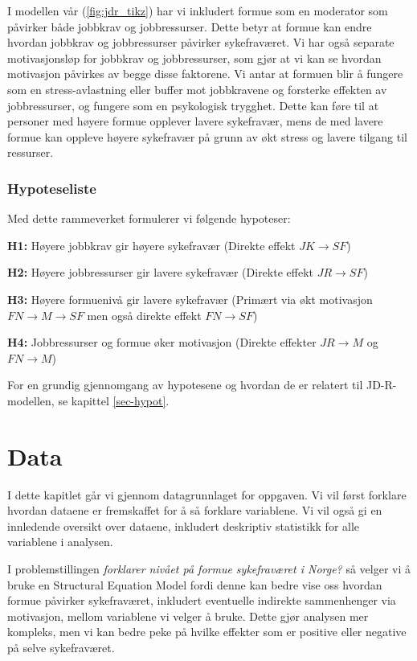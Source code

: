 \documentclass[
  12pt,
  a4paper,
  DIV=11,
  numbers=noendperiod]{scrartcl}
\begin{document}
I modellen vår (\autoref{fig:jdr_tikz}) har vi inkludert formue som en
moderator som påvirker både jobbkrav og jobbressurser. Dette betyr at
formue kan endre hvordan jobbkrav og jobbressurser påvirker
sykefraværet. Vi har også separate motivasjonsløp for jobbkrav og
jobbressurser, som gjør at vi kan se hvordan motivasjon påvirkes av
begge disse faktorene. Vi antar at formuen blir å fungere som en
stress-avlastning eller buffer mot jobbkravene og forsterke effekten av
jobbressurser, og fungere som en psykologisk trygghet. Dette kan føre
til at personer med høyere formue opplever lavere sykefravær, mens de
med lavere formue kan oppleve høyere sykefravær på grunn av økt stress
og lavere tilgang til ressurser.

\subsubsection{Hypoteseliste}\label{hypoteseliste}

Med dette rammeverket formulerer vi følgende hypoteser:

\textbf{H1:} Høyere jobbkrav gir høyere sykefravær (Direkte effekt
\(JK \rightarrow SF\))

\textbf{H2:} Høyere jobbressurser gir lavere sykefravær (Direkte effekt
\(JR \rightarrow SF\))

\textbf{H3:} Høyere formuenivå gir lavere sykefravær (Primært via økt
motivasjon \(FN \rightarrow M \rightarrow SF\) men også direkte effekt
\(FN \rightarrow SF\))

\textbf{H4:} Jobbressurser og formue øker motivasjon (Direkte effekter
\(JR \rightarrow M\) og \(FN \rightarrow M\))

For en grundig gjennomgang av hypotesene og hvordan de er relatert til
JD-R-modellen, se kapittel \ref{sec-hypot}.

\section{Data}\label{data}

I dette kapitlet går vi gjennom datagrunnlaget for oppgaven. Vi vil
først forklare hvordan dataene er fremskaffet for å så forklare
variablene. Vi vil også gi en innledende oversikt over dataene,
inkludert deskriptiv statistikk for alle variablene i analysen.

I problemstillingen \emph{forklarer nivået på formue sykefraværet i
Norge?} så velger vi å bruke en Structural Equation Model fordi denne
kan bedre vise oss hvordan formue påvirker sykefraværet, inkludert
eventuelle indirekte sammenhenger via motivasjon, mellom variablene vi
velger å bruke. Dette gjør analysen mer kompleks, men vi kan bedre peke
på hvilke effekter som er positive eller negative på selve sykefraværet.
\end{document}
